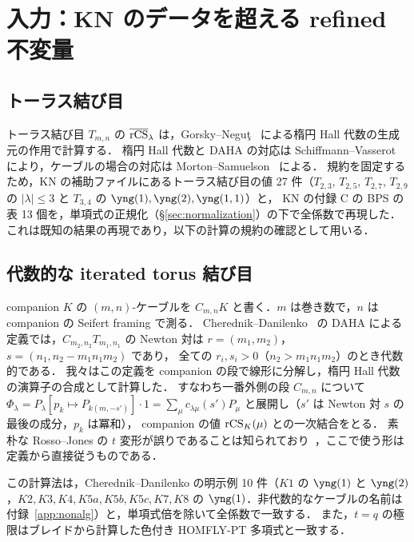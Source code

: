 \section{入力：KN のデータを超える refined 不変量}\label{sec:inputs}

\subsection{トーラス結び目}
トーラス結び目 $T_{m,n}$ の $\overline{\textrm{rCS}}_\lambda$ は，Gorsky--Neguţ~\cite{Gorsky13b} による楕円 Hall 代数の生成元の作用で計算する．
楕円 Hall 代数と DAHA の対応は Schiffmann--Vasserot~\cite{Schiffmann09} により，ケーブルの場合の対応は Morton--Samuelson~\cite{Morton14} による．
規約を固定するため，KN の補助ファイルにあるトーラス結び目の値 27 件（$T_{2,3}$, $T_{2,5}$, $T_{2,7}$, $T_{2,9}$ の $|\lambda|\le3$ と $T_{3,4}$ の $\yng(1),\yng(2),\yng(1,1)$）と，
KN の付録 C の BPS の表 13 個を，単項式の正規化（\S\ref{sec:normalization}）の下で全係数で再現した．
これは既知の結果の再現であり，以下の計算の規約の確認として用いる．

\subsection{代数的な iterated torus 結び目}
companion $K$ の $(m,n)$-ケーブルを $C_{m,n}K$ と書く．$m$ は巻き数で，$n$ は companion の Seifert framing で測る．
Cherednik--Danilenko~\cite{Cherednik14,Cherednik15} の DAHA による定義では，$C_{m_2,n_2}T_{m_1,n_1}$ の Newton 対は $r=(m_1,m_2)$，$s=(n_1,n_2-m_1n_1m_2)$ であり，
全ての $r_i,s_i>0$（$n_2>m_1n_1m_2$）のとき代数的である．
我々はこの定義を companion の段で線形に分解し，楕円 Hall 代数の演算子の合成として計算した．
すなわち一番外側の段 $C_{m,n}$ について $\Phi_\lambda=P_\lambda[p_k\mapsto P_{k(m,-s')}]\cdot1=\sum_\mu c_{\lambda\mu}(s')P_\mu$ と展開し（$s'$ は Newton 対 $s$ の最後の成分，$p_k$ は冪和），
companion の値 $\textrm{rCS}_K(\mu)$ との一次結合をとる．
素朴な Rosso--Jones の $t$ 変形が誤りであることは知られており~\cite{Danilenko14,Morozov18}，ここで使う形は定義から直接従うものである．
\begin{compresult}\label{cr:daha}
この計算法は，Cherednik--Danilenko の明示例 10 件（$K1$ の $\yng(1)$ と $\yng(2)$，$K2,K3,K4,K5a,K5b,K5c,K7,K8$ の $\yng(1)$．非代数的なケーブルの名前は付録~\ref{app:nonalg}）と，単項式倍を除いて全係数で一致する．
また，$t=q$ の極限はブレイドから計算した色付き HOMFLY-PT 多項式と一致する．
\end{compresult}

